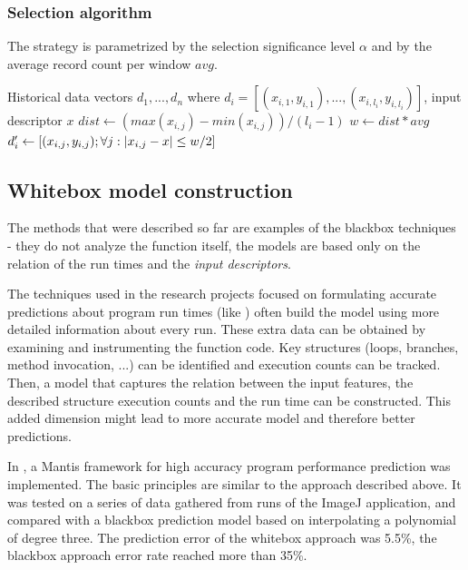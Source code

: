 \subsubsection{Selection algorithm}

The strategy is parametrized by the selection significance level $\alpha$ and by the average record count per window $avg$.

\begin{algorithmic}[1] %
	\INPUT Historical data vectors $d_1,...,d_n$ where $d_i = [(x_{i,1}, y_{i,1}),...,(x_{i,l_i}, y_{i,l_i})]$, input descriptor $x$
	\State $dist \gets (max(x_{i,j}) - min(x_{i,j})) / (l_i-1)$
	\State $w \gets dist * avg$
	\State $d'_i \gets [(x_{i,j}, y_{i, j}); \forall j: \left|{x_{i,j} - x}\right| \leq w/2]$
	\EndFor
	\State {}
\end{algorithmic}

\subsection{Whitebox model construction}

The methods that were described so far are examples of the blackbox techniques - they do not analyze the function itself, the models are based only on the relation of the run times and the \textit{input descriptors}. 

The techniques used in the research projects focused on formulating accurate predictions about program run times (like \cite{goldsmith_measuring_2007,chun_mantis:_2010,huang_predicting_2010}) often build the model using more detailed information about every run. These extra data can be obtained by examining and instrumenting the function code. Key structures (loops, branches, method invocation, ...) can be identified and execution counts can be tracked. Then, a model that captures the relation between the input features, the described structure execution counts and the run time can be constructed. This added dimension might lead to more accurate model and therefore better predictions.

In \cite{chun_mantis:_2010}, a Mantis framework for high accuracy program performance prediction was implemented. The basic principles are similar to the approach described above. It was tested on a series of data gathered from runs of the ImageJ application, and compared with a blackbox prediction model based on interpolating a polynomial of degree three. The prediction error of the whitebox approach was 5.5\%, the blackbox approach error rate reached more than 35\%.

